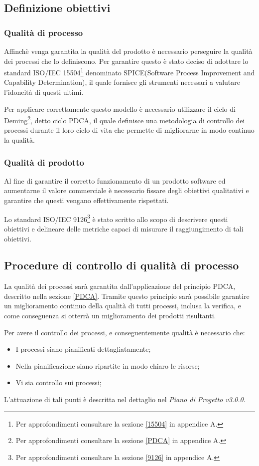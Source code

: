 \subsection{Definizione obiettivi}
\subsubsection{Qualità di processo}
Affinchè venga garantita la qualità del prodotto è necessario perseguire la qualità dei processi che lo definiscono. Per garantire questo è stato deciso di adottare lo standard ISO/IEC 15504\footnote{Per approfondimenti consultare la sezione \ref{15504} in appendice A.} denominato SPICE(Software Process Improvement and Capability Determination), il quale fornisce gli strumenti necessari a valutare l'idoneità di questi ultimi.

\noindent Per applicare correttamente questo modello è necessario utilizzare il ciclo di Deming\footnote{Per approfondimenti consultare la sezione \ref{PDCA} in appendice A.}, detto ciclo PDCA, il quale definisce una metodologia di controllo dei processi durante il loro ciclo di vita che permette di migliorarne in modo continuo la qualità.

\subsubsection{Qualità di prodotto}
Al fine di garantire il corretto funzionamento di un prodotto software ed aumentarne il valore commerciale è necessario fissare degli obiettivi qualitativi e garantire che questi vengano effettivamente rispettati.

\noindent Lo standard ISO/IEC 9126\footnote{Per approfondimenti consultare la sezione \ref{9126} in appendice A.} è stato scritto allo scopo di descrivere questi obiettivi e delineare delle metriche capaci di misurare il raggiungimento di tali obiettivi.

\subsection{Procedure di controllo di qualità di processo}
La qualità dei processi sarà garantita dall'applicazione del principio PDCA, descritto nella sezione \ref{PDCA}. Tramite questo principio sarà possibile garantire un miglioramento continuo della qualità di tutti processi, inclusa la verifica, e come conseguenza si otterrà un miglioramento dei prodotti risultanti.

\noindent Per avere il controllo dei processi, e conseguentemente qualità è necessario che:
\begin{itemize}
	\item I processi siano pianificati dettagliatamente;
	\item Nella pianificazione siano ripartite in modo chiaro le risorse;
	\item Vi sia controllo sui processi;
\end{itemize}
\noindent L'attuazione di tali punti è descritta nel dettaglio nel \textit{Piano di Progetto v3.0.0}.

